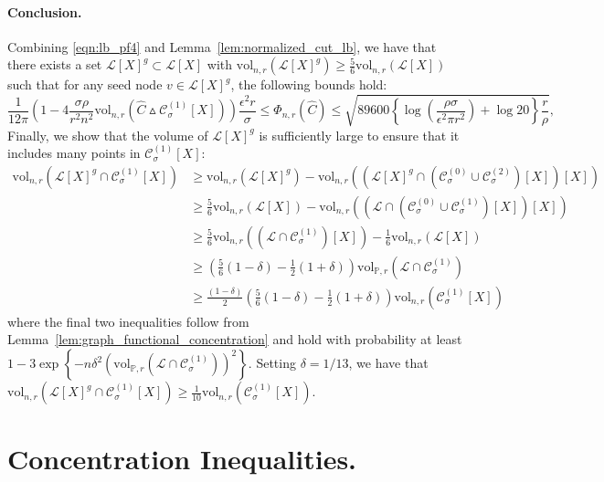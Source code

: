 \documentclass[11pt,twoside]{article}
\newcommand{\set}[1]{\left\{#1\right\}}
\newcommand{\vol}{\mathrm{vol}}
\newcommand{\1}{\mathbf{1}}
\newcommand{\Xbf}{X}             %
\newcommand{\Pbb}{\mathbb{P}}
\newcommand{\Cset}{\mathcal{C}}
\newcommand{\Csig}{\Cset_{\sigma}}
\begin{document}
\paragraph{Conclusion.}
Combining \eqref{eqn:lb_pf4} and Lemma~\ref{lem:normalized_cut_lb}, we have that there exists a set $\mathcal{L}[\Xbf]^g \subset \mathcal{L}[\Xbf]$ with $\vol_{n,r}(\mathcal{L}[\Xbf]^g) \geq \frac{5}{6}\vol_{n,r}(\mathcal{L}[\Xbf])$ such that for any seed node $v \in \mathcal{L}[\Xbf]^g$, the following bounds hold:
\begin{equation*}
 \frac{1}{12\pi} \left(1 - 4\frac{\sigma \rho}{r^2 n^2} \vol_{n,r}(\widehat{C} \vartriangle \mathcal{C}_{\sigma}^{(1)}[\Xbf]) \right) \frac{\epsilon^2 r}{\sigma} \leq \Phi_{n,r}(\widehat{C}) \leq \sqrt{89600\left\{\log\left(\frac{\rho \sigma}{\epsilon^2 \pi r^2}\right) + \log 20\right\} \frac{r}{\rho}},
\end{equation*}
Finally, we show that the volume of $\mathcal{L}[\Xbf]^g$ is sufficiently large to ensure that it includes many points in $\mathcal{C}_{\sigma}^{(1)}[\Xbf]$:
\begin{align*}
\vol_{n,r}(\mathcal{L}[\Xbf]^g \cap \mathcal{C}_{\sigma}^{(1)}[\Xbf]) & \geq  \vol_{n,r}(\mathcal{L}[\Xbf]^g) - \vol_{n,r}((\mathcal{L}[\Xbf]^g \cap (\mathcal{C}_{\sigma}^{(0)} \cup \mathcal{C}_{\sigma}^{(2)})[\Xbf])[\Xbf]) \\
& \geq \frac{5}{6}\vol_{n,r}(\mathcal{L}[\Xbf]) - \vol_{n,r}((\mathcal{L} \cap (\mathcal{C}_{\sigma}^{(0)} \cup \mathcal{C}_{\sigma}^{(1)})[\Xbf])[\Xbf]) \\
& \geq \frac{5}{6}\vol_{n,r}((\mathcal{L} \cap \mathcal{C}_{\sigma}^{(1)})[\Xbf]) - \frac{1}{6}\vol_{n,r}(\mathcal{L}[\Xbf]) \\
& \geq \left(\frac{5}{6}(1 - \delta) - \frac{1}{2}(1 + \delta)\right)\vol_{\Pbb,r}( \mathcal{L} \cap \Csig^{(1)}) \\
& \geq \frac{(1 - \delta)}{2}\left(\frac{5}{6}(1 - \delta) - \frac{1}{2}(1 + \delta)\right)\vol_{n,r}(\mathcal{C}_{\sigma}^{(1)}[\Xbf])
\end{align*}
where the final two inequalities follow from Lemma~\ref{lem:graph_functional_concentration} and hold with probability at least $1 - 3\exp\set{-n\delta^2(\vol_{\Pbb,r}( \mathcal{L} \cap \Csig^{(1)}))^2}$. Setting $\delta = 1/13$, we have that $\vol_{n,r}(\mathcal{L}[\Xbf]^g \cap \mathcal{C}_{\sigma}^{(1)}[\Xbf]) \geq \frac{1}{10}\vol_{n,r}(\mathcal{C}_{\sigma}^{(1)}[\Xbf])$.

\section{Concentration Inequalities.}
\end{document}
